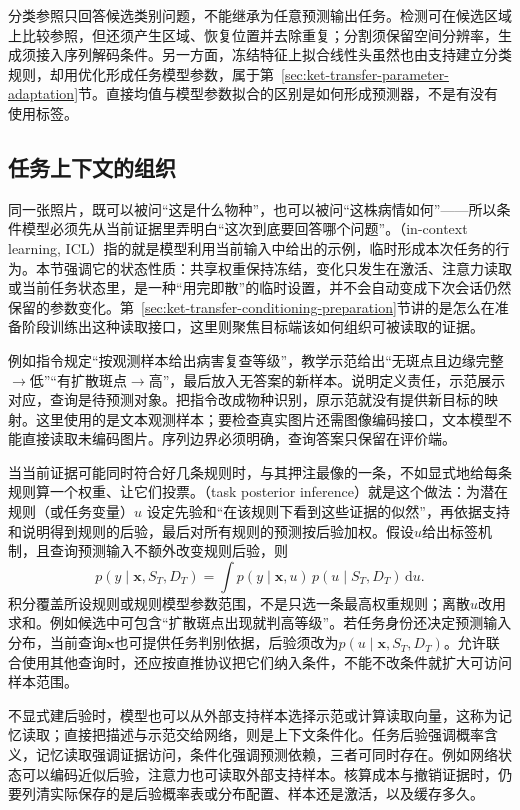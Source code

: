 分类参照只回答候选类别问题，不能继承为任意预测输出任务。检测可在候选区域上比较参照，但还须产生区域、恢复位置并去除重复；分割须保留空间分辨率，生成须接入序列解码条件。另一方面，冻结特征上拟合线性头虽然也由支持建立分类规则，却用优化形成任务模型参数，属于第~\ref{sec:ket-transfer-parameter-adaptation}节。直接均值与模型参数拟合的区别是如何形成预测器，不是有没有使用标签。

\subsection{任务上下文的组织}
\label{sec:ket-transfer-context}

同一张照片，既可以被问“这是什么物种”，也可以被问“这株病情如何”——所以条件模型必须先从当前证据里弄明白“这次到底要回答哪个问题”。（in-context learning, ICL）指的就是模型利用当前输入中给出的示例，临时形成本次任务的行为。本节强调它的状态性质：共享权重保持冻结，变化只发生在激活、注意力读取或当前任务状态里，是一种“用完即散”的临时设置，并不会自动变成下次会话仍然保留的参数变化。第~\ref{sec:ket-transfer-conditioning-preparation}节讲的是怎么在准备阶段训练出这种读取接口，这里则聚焦目标端该如何组织可被读取的证据。

例如指令规定“按观测样本给出病害复查等级”，教学示范给出“无斑点且边缘完整$\rightarrow$低”“有扩散斑点$\rightarrow$高”，最后放入无答案的新样本。说明定义责任，示范展示对应，查询是待预测对象。把指令改成物种识别，原示范就没有提供新目标的映射。这里使用的是文本观测样本；要检查真实图片还需图像编码接口，文本模型不能直接读取未编码图片。序列边界必须明确，查询答案只保留在评价端。

当当前证据可能同时符合好几条规则时，与其押注最像的一条，不如显式地给每条规则算一个权重、让它们投票。（task posterior inference）就是这个做法：为潜在规则（或任务变量）$u$ 设定先验和“在该规则下看到这些证据的似然”，再依据支持和说明得到规则的后验，最后对所有规则的预测按后验加权。假设$u$给出标签机制，且查询预测输入不额外改变规则后验，则
\begin{equation}
  p(y\mid\bm x,S_T,D_T)
  =\int p(y\mid\bm x,u)\,
          p(u\mid S_T,D_T)\,\mathrm du.
  \label{eq:ket-transfer-task-posterior}
\end{equation}
积分覆盖所设规则或规则模型参数范围，不是只选一条最高权重规则；离散$u$改用求和。例如候选中可包含“扩散斑点出现就判高等级”。若任务身份还决定预测输入分布，当前查询$\bm x$也可提供任务判别依据，后验须改为$p(u\mid\bm x,S_T,D_T)$。允许联合使用其他查询时，还应按直推协议把它们纳入条件，不能不改条件就扩大可访问样本范围。

不显式建后验时，模型也可以从外部支持样本选择示范或计算读取向量，这称为记忆读取；直接把描述与示范交给网络，则是上下文条件化。任务后验强调概率含义，记忆读取强调证据访问，条件化强调预测依赖，三者可同时存在。例如网络状态可以编码近似后验，注意力也可读取外部支持样本。核算成本与撤销证据时，仍要列清实际保存的是后验概率表或分布配置、样本还是激活，以及缓存多久。

